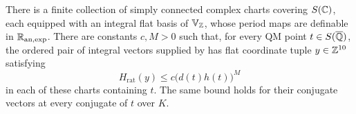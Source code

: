 \begin{lemma}\label{lem:flat-coordinate-bound}
There is a finite collection of simply connected complex charts covering
$S(\mathbb C)$, each equipped with an integral flat basis of $\mathbb V_{\mathbb Z}$, whose
period maps are definable in $\mathbb R_{\mathrm{an},\exp}$.  There are constants
$c,M>0$ such that, for every QM point $t\in S(\overline{\mathbb Q})$, the ordered pair
of integral vectors supplied by  has flat
coordinate tuple $y\in\mathbb Z^{10}$ satisfying
\begin{equation}\label{eq:flat-coordinate-height}
 H_{\mathrm{rat}}(y)\le c\bigl(d(t)h(t)\bigr)^M
\end{equation}
in each of these charts containing $t$.  The same bound holds for their
conjugate vectors at every conjugate of $t$ over $K$.
\end{lemma}

